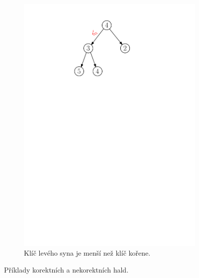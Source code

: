 \begin{figure}[h]
\begin{subfigure}{5cm}
        \includegraphics[scale=.4]{01-grafalgo/images/ch01_nekor_halda_2}
        \caption{Klíč levého syna je menší než klíč kořene.}
        \label{subfig:nekorektni_halda_2}
    \end{subfigure}
    \caption{Příklady korektních a nekorektních hald.}
    \label{fig:halda_modely}
\end{figure}

